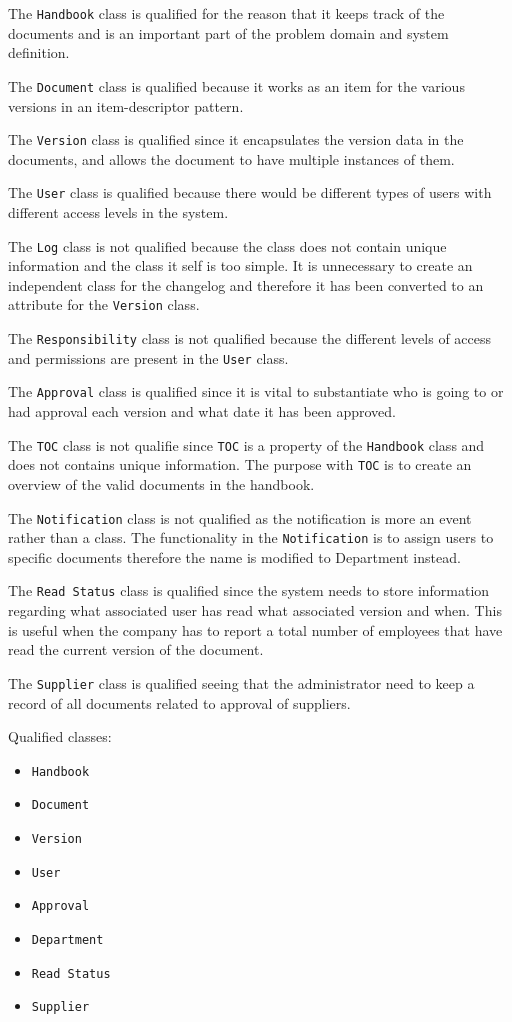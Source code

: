 The \texttt{Handbook} class is qualified for the reason that it keeps track of the documents and is an important part of the problem domain and system definition.

The \texttt{Document} class is qualified because it works as an item for the various versions in an item-descriptor pattern.

The \texttt{Version} class is qualified since it encapsulates the version data in the documents, and allows the document to have multiple instances of them.

The \texttt{User} class is qualified because there would be different types of users with different access levels in the system.

The \texttt{Log} class is not qualified because the class does not contain unique information and the class it self is too simple. It is unnecessary to create an independent class for the changelog and therefore it has been converted to an attribute for the \texttt{Version} class.

The \texttt{Responsibility} class is not qualified because the different levels of access and permissions are present in the \texttt{User} class.

The \texttt{Approval} class is qualified since it is vital to substantiate who is going to or had approval each version and what date it has been approved.

The \texttt{TOC} class is not qualifie since \texttt{TOC} is a property of the \texttt{Handbook} class and does not contains unique information. The purpose with \texttt{TOC} is to create an overview of the valid documents in the handbook.

The \texttt{Notification} class is not qualified as the notification is more an event rather than a class. The functionality in the \texttt{Notification} is to assign users to specific documents therefore the name is modified to Department instead.

The \texttt{Read Status} class is qualified since the system needs to store information regarding what associated user has read what associated version and when. This is useful when the company has to report a total number of employees that have read the current version of the document.

The \texttt{Supplier} class is qualified seeing that the administrator need to keep a record of all documents related to approval of suppliers. %

Qualified classes:
\begin{itemize}
	\item \texttt{Handbook}
	\item \texttt{Document}
	\item \texttt{Version}
	\item \texttt{User}
	\item \texttt{Approval}
	\item \texttt{Department}
	\item \texttt{Read Status}
	\item \texttt{Supplier}
\end{itemize}

